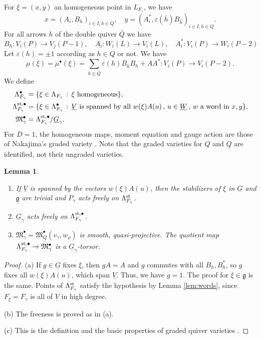 \documentclass[11pt,reqno]{amsart}
\newtheorem{Lemma}[Theorem]{Lemma}
\theoremstyle{definition}
\theoremstyle{remark}
\def\dG{\underline G}
\def\dV{\underline V}
\def\dW{\underline W}
\def\dQ{\underline Q}
\def\dg{\underline{\mathfrak g}}
\def\M{\mathfrak M}
\begin{document}
For $\xi=(x,y)$ an homogeneous point in $L_{F_\gamma}$, we have
\[
x=(A_i,B_h)_{i\in I,h\in Q},\quad y=(A_i^*,\varepsilon(\bar h)B_{\bar h})_{i\in I,h\in Q}.
\]
For all arrows $h$ of the double quiver $\bar Q$ we have
$$B_h:V_i(P)\to V_j(P-1)
,\quad
A_i:W_i(L)\to V_i(L)
,\quad
A_i^*:V_i(P)\to W_i(P-2)$$
Let $\varepsilon(h)=\pm1$ according as $h\in Q$ or not. We have 
$$\mu(\xi)=\mu^\bullet(\xi)=\sum_{h\in\bar Q}\varepsilon(h)B_{\bar h}B_h+AA^*:V_i(P)\to V_i(P-2).$$ 
We define
\begin{align}\label{LB}
\begin{split}
\Lambda_{F_\gamma}^\bullet&=\{\xi\in\Lambda_{F_\gamma}\,:\, \xi\ \text{homogeneous}\},\\
\Lambda_{F_\gamma}^{\rm st,\bullet}&
=\{\xi\in\Lambda_{F_\gamma}^\bullet\,:\,\dV\ \text{is spanned by all}\ w(\xi)A(u)\,,\,u\in\dW\,,\, w\ \text{a word in }x,y\},\\
 \M^\bullet_\gamma&=\Lambda_{F_\gamma}^{\rm st,\bullet}/\dG_\gamma.
\end{split}
\end{align}
For $D=1$, the homogeneous maps, moment equation and gauge action
are those of Nakajima's graded variety \cite[\S4]{Nak01}.
Note that the graded varieties for $Q$ and $\dQ$ are identified, not their ungraded varieties.

\begin{Lemma}\label{lem:free}\hfill
\begin{enumerate}[label=$\mathrm{(\alph*)}$,leftmargin=8mm,itemsep=1mm]
\item If $\dV$ is spanned by the vectors $w(\xi)A(u)$, then the stabilizers of $\xi$ in $\dG$ and $\dg$ are
trivial and $P_\gamma$ acts freely on $\Lambda^{\rm st}_{F_\gamma}$.
\item $\dG_\gamma$ acts freely on $\Lambda_{F_\gamma}^{\rm st,\bullet}$.
\item 
$\M^\bullet_\gamma=\M_{\dQ}^\bullet(v_\gamma,w_\rho)$
is smooth, quasi-projective. The quotient map
$\Lambda_{F_\gamma}^{\rm st,\bullet}\to\M^\bullet_\gamma$ is a $\dG_\gamma$-torsor.
\end{enumerate}
\end{Lemma}

\begin{proof}\hfill

(a) If $g\in\dG$ fixes $\xi$, then $gA=A$ and $g$ commutes with all $B_h,B_h^*$, so $g$ fixes all $w(\xi)A(u)$, which span $\dV$.
Thus, we have $g=1$. 
The proof for $\xi\in\dg$ is the same. 
Points of $\Lambda^{\rm st}_{F_\gamma}$ satisfy the hypothesis by Lemma \ref{lem:words}, 
since $F_\xi=F_\gamma$ is
all of $\dV$ in high degree. 

(b) The freeness is proved as in (a). 

(c) This is the definition and the basic properties of graded quiver varieties \cite[\S\S3-4]{Nak01}.
\end{proof}
\end{document}
